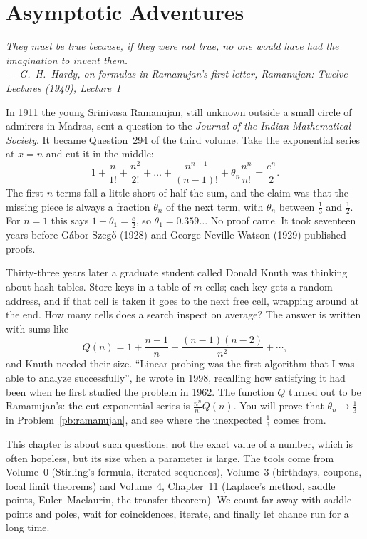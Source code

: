 \chapter{Asymptotic Adventures}

\begin{center}\itshape
They must be true because, if they were not true, no one would have had the imagination to invent them.\\
\upshape --- G.~H.~Hardy, on formulas in Ramanujan's first letter, \emph{Ramanujan: Twelve Lectures} (1940), Lecture~I
\end{center}

In 1911 the young Srinivasa Ramanujan, still unknown outside a small circle of admirers in Madras, sent a question to the \emph{Journal of the Indian Mathematical
Society}. It became Question~294 of the third volume. Take the exponential series at $x=n$ and cut it in the middle:
\[
1+\frac n{1!}+\frac{n^2}{2!}+\dots+\frac{n^{n-1}}{(n-1)!}+\theta_n\frac{n^n}{n!}=\frac{e^n}2.
\]
The first $n$ terms fall a little short of half the sum, and the claim was that the missing piece is always a fraction $\theta_n$
of the next term, with $\theta_n$ between $\frac13$ and $\frac12$. For $n=1$ this says $1+\theta_1=\frac e2$, so $\theta_1=0.359\ldots$ No proof came. It took seventeen
years before G\'abor Szeg\H o (1928) and George Neville Watson (1929) published proofs.

Thirty-three years later a graduate student called Donald Knuth was thinking about hash tables. Store keys in a table of $m$ cells;
each key gets a random address, and if that cell is taken it goes to the next free cell, wrapping around at the end. How many cells
does a search inspect on average? The answer is written with sums like
\[
Q(n)=1+\frac{n-1}n+\frac{(n-1)(n-2)}{n^2}+\cdots,
\]
and Knuth needed their size. ``Linear probing was the first algorithm that I was able to analyze successfully'', he wrote in
1998, recalling how satisfying it had been when he first studied the problem in 1962. The function $Q$ turned out to be Ramanujan's: the cut exponential series is $\frac{n^n}{n!}Q(n)$. You
will prove that $\theta_n\to\frac13$ in Problem~\ref{pb:ramanujan}, and see where the unexpected $\frac13$ comes from.

This chapter is about such questions: not the exact value of a number, which is often hopeless, but its size when a parameter is
large. The tools come from Volume~0 (Stirling's formula, iterated sequences), Volume~3 (birthdays, coupons, local limit theorems) and
Volume~4, Chapter~11 (Laplace's method, saddle points, Euler--Maclaurin, the transfer theorem). We count far away with saddle
points and poles, wait for coincidences, iterate, and finally let chance run for a long time.

